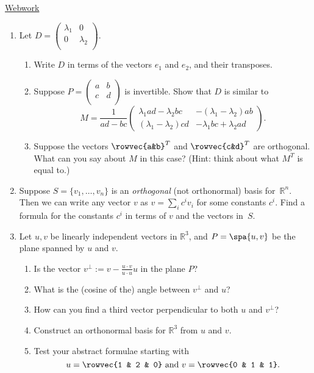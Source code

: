 \href{\webworkurl}{Webwork}


\begin{enumerate}
\item Let $D=\begin{pmatrix}
\lambda_1 & 0 \\
0 & \lambda_2 \\
\end{pmatrix}$.
\begin{enumerate}
\item Write $D$ in terms of the vectors $e_1$ and $e_2$, and their transposes.
\item Suppose $P=\begin{pmatrix}
a & b \\
c & d \\
\end{pmatrix}$ is invertible.  Show that $D$ is similar to
\[
M=\frac{1}{ad-bc}\begin{pmatrix}
\lambda_1ad-\lambda_2bc & -(\lambda_1-\lambda_2)ab \\[1mm]
(\lambda_1-\lambda_2)cd & -\lambda_1bc + \lambda_2ad
\end{pmatrix}.
\]
\item Suppose the vectors $\rowvec{a&b}^T$ and $\rowvec{c&d}^T$ are orthogonal.  What can you say about $M$ in this case? (Hint: think about what \(M^T\) is equal to.)
\end{enumerate}


\item \label{orthogprob} Suppose $S=\{v_1, \ldots, v_n \}$ is an \emph{orthogonal} (not orthonormal) basis for~$\mathbb{R}^n$.  Then we can write any vector $v$ as $v=\sum_ic^iv_i$ for some constants $c^i$.  Find a formula for the constants $c^i$ in terms of $v$ and the vectors in~$S$.


\item \label{orthogprojprob} Let $u,v$ be linearly independent vectors in $\mathbb{R}^3$, and $P=\spa \{ u,v\}$ be the plane spanned by $u$ and $v$.  
\begin{enumerate}
\item Is the vector $v^\bot := v-\frac{u\cdot v}{u\cdot u}u$ in the plane $P$?
\item  What is the (cosine of the) angle between $v^\bot$ and $u$?
\item %
How can you find a third vector perpendicular to both $u$ and $v^\bot$?
\item  Construct an orthonormal basis for $\mathbb{R}^3$ from $u$ and $v$.
\item  Test your abstract formulae starting with 
\[
u=\rowvec{1 & 2 & 0} \text{ and } v=\rowvec{0 & 1 & 1}.
\]
\end{enumerate}


\end{enumerate}
